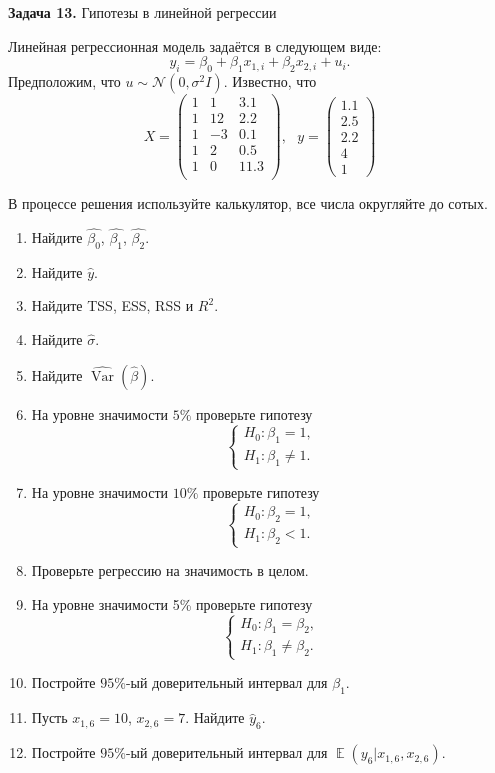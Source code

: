 \documentclass[10pt, a4paper]{extarticle}
\DeclareMathOperator{\Var}{Var}
\DeclareMathOperator{\E}{\mathbb{E}}
\begin{document}
	{\Large \textbf{Задача 13.} Гипотезы в линейной регрессии}
	
	Линейная регрессионная модель задаётся в следующем виде:
	\[
	y_i = \beta_0 + \beta_1x_{1, i} + \beta_2x_{2, i} + u_i.
	\] 
	Предположим, что $u \sim \mathcal{N}(0, \sigma^2I)$. Известно, что
	\[
	X = \begin{pmatrix}
		1 & 1 & 3.1 \\
		1 & 12 & 2.2 \\
		1 & -3 & 0.1 \\
		1 & 2 & 0.5 \\
		1 & 0 & 11.3 \\
	\end{pmatrix},\text{  }
	y = \begin{pmatrix}
		1.1 \\
		2.5 \\
		2.2 \\
		4 \\
		1
	\end{pmatrix}
	\]
	
	В процессе решения используйте калькулятор, все числа округляйте до сотых.
	
	\begin{enumerate}
		\item Найдите $\hat{\beta_0}$, $\hat{\beta_1}$, $\hat{\beta_2}$.
		\item Найдите $\hat{y}$.
		\item Найдите TSS, ESS, RSS и $R^2$.
		\item Найдите $\hat{\sigma}$.
		\item Найдите $\widehat{\Var}(\hat{\beta})$.
		\item На уровне значимости $5\%$ проверьте гипотезу
		\[
		\begin{cases}
			H_0: \beta_1 = 1, \\
			H_1: \beta_1 \ne 1.
		\end{cases}
		\]
		\item На уровне значимости $10\%$ проверьте гипотезу
		\[
		\begin{cases}
			H_0: \beta_2 = 1, \\
			H_1: \beta_2 < 1.
		\end{cases}
		\]
		\item Проверьте регрессию на значимость в целом.
		\item На уровне значимости 5\% проверьте гипотезу
		\[
		\begin{cases}
			H_0: \beta_1 = \beta_2, \\
			H_1: \beta_1 \ne \beta_2.
		\end{cases}
		\]
		\item Постройте $95\%$-ый доверительный интервал для $\beta_1$.
		\item Пусть $x_{1, 6} = 10$, $x_{2, 6} = 7$. Найдите $\hat{y}_6$.
		\item Постройте $95\%$-ый доверительный интервал для $\E(y_6 | x_{1, 6}, x_{2, 6})$.
	\end{enumerate}
\end{document}
